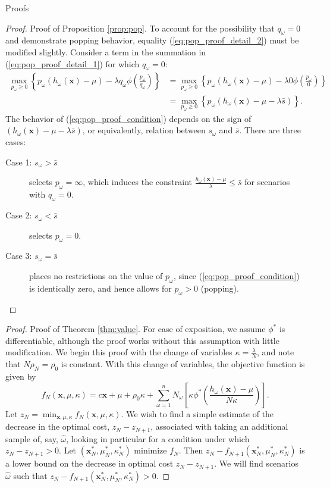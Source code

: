 \documentclass[ijoc,letterpaper]{informs3} %
\newcommand{\x}{\mathbf{x}}
\begin{document}
\begin{APPENDIX}{Proofs}
\begin{proof}{\sc Proof of Proposition \ref{prop:pop}.}
	To account for the possibility that $q_\omega = 0$ and demonstrate popping behavior, equality (\ref{eq:pop_proof_detail_2}) must be modified slightly.
	Consider a term in the summation in (\ref{eq:pop_proof_detail_1}) for which $q_\omega = 0$:
	\begin{align}
		\max_{p_\omega \geq 0} \left\{ p_\omega (h_\omega(\x) - \mu) - \lambda q_\omega  \phi\left(\frac{p_\omega}{q_\omega}\right) \right\} & = \max_{p_\omega \geq 0} \left\{ p_\omega (h_\omega(\x) - \mu) - \lambda 0  \phi\left(\frac{p_\omega}{0}\right) \right\} \nonumber \\
		& = \max_{p_\omega \geq 0} \left\{ p_\omega \left( h_\omega(\x) - \mu - \lambda \bar{s} \right) \right\}. \label{eq:pop_proof_condition}
	\end{align}
	The behavior of (\ref{eq:pop_proof_condition}) depends on the sign of $\left( h_\omega(\x) - \mu - \lambda \bar{s}  \right)$, or equivalently, relation between $s_\omega$ and $\bar{s}$.
	There are three cases:
	\begin{description}
		\item[Case 1: $s_\omega > \bar{s}$] selects $p_\omega = \infty$, which induces the constraint $\frac{h_\omega(\x) - \mu}{\lambda} \leq \bar{s}$ for scenarios with $q_\omega = 0$.
		\item[Case 2: $s_\omega < \bar{s}$] selects $p_\omega = 0$.
		\item[Case 3: $s_\omega = \bar{s}$] places no restrictions on the value of $p_\omega$, since (\ref{eq:pop_proof_condition}) is identically zero, and hence allows for $p_\omega > 0$ (popping). \Halmos %
	\end{description}
\end{proof}

\begin{proof}{\sc Proof of Theorem \ref{thm:value}.}
	For ease of exposition, we assume $\phi^*$ is differentiable, although the proof works without this assumption with little modification.	
	We begin this proof with the change of variables $\kappa = \frac{\lambda}{N}$, and note that $N\rho_N = \rho_0$ is constant.	
	With this change of variables, the objective function is given by
	\[
		f_N(\x,\mu,\kappa) = c\x + \mu + \rho_0 \kappa + \sum_{\omega = 1}^n N_\omega \left[ \kappa \phi^*\left(\frac{h_\omega(\x) - \mu}{N\kappa} \right) \right].
	\]
	Let $z_N = \min_{\x,\mu,\kappa} f_N(\x,\mu,\kappa)$.
	We wish to find a simple estimate of the decrease in the optimal cost, $z_N - z_{N+1}$, associated with taking an additional sample of, say, $\hat{\omega}$, looking in particular for a condition under which $z_N - z_{N+1} > 0$.	
	Let $(\x^*_N,\mu^*_N,\kappa^*_N)$ minimize $f_N$.
	Then $z_N - f_{N+1}(\x^*_N,\mu^*_N,\kappa^*_N)$ is a lower bound on the decrease in optimal cost $z_N - z_{N+1}$.
	We will find scenarios $\hat{\omega}$ such that $z_N - f_{N+1}(\x^*_N,\mu^*_N,\kappa^*_N) > 0$.


\end{proof}
\end{APPENDIX}
\end{document}
